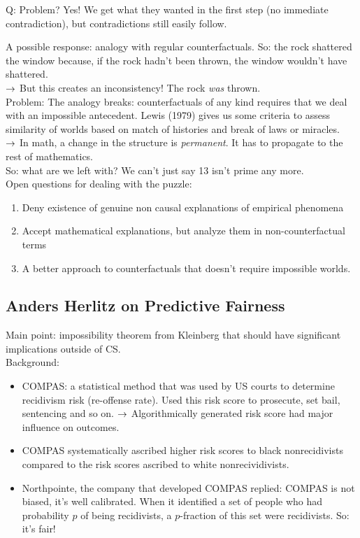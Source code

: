 Q: Problem? Yes! We get what they wanted in the first step (no immediate contradiction), but contradictions still easily follow.

A possible response: analogy with regular counterfactuals. So: the rock shattered the window because, if the rock hadn't been thrown, the window wouldn't have shattered. \\

$\rightarrow$ But this creates an inconsistency! The rock {\it was} thrown. \\

Problem: The analogy breaks: counterfactuals of any kind requires that we deal with an impossible antecedent. Lewis (1979) gives us some criteria to assess similarity of worlds based on match of histories and break of laws or miracles. \\

$\rightarrow$ In math, a change in the structure is {\it permanent}. It has to propagate to the rest of mathematics. \\

So: what are we left with? We can't just say 13 isn't prime any more. \\

Open questions for dealing with the puzzle:
\begin{enumerate}
	\item Deny existence of genuine non causal explanations of empirical phenomena
	\item Accept mathematical explanations, but analyze them in non-counterfactual terms
	\item A better approach to counterfactuals that doesn't require impossible worlds.
\end{enumerate}


\spacerule

\subsection{Anders Herlitz on Predictive Fairness}

Main point: impossibility theorem from Kleinberg that should have significant implications outside of CS. \\

Background:
\begin{itemize}
\item COMPAS: a statistical method that was used by US courts to determine recidivism risk (re-offense rate). Used this risk score to prosecute, set bail, sentencing and so on.
$\rightarrow$ Algorithmically generated risk score had major influence on outcomes.
\item COMPAS systematically ascribed higher risk scores to black nonrecidivists compared to the risk scores ascribed to white nonrecividivists.
\item Northpointe, the company that developed COMPAS replied: COMPAS is not biased, it's well calibrated. When it identified a set of people who had probability $p$ of being recidivists, a $p$-fraction of this set were recidivists. So: it's fair!
\end{itemize}

